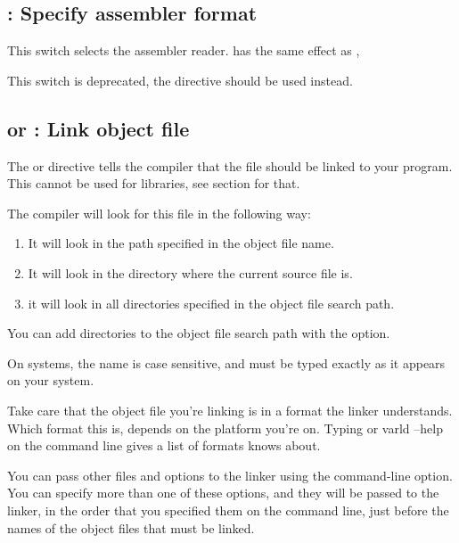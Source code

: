 \subsection{ : Specify assembler format}

This switch selects the assembler reader. 
has the same effect as , 

This switch is deprecated, the  directive should
be used instead.

\subsection{ or  : Link object file}

The  or  directive
tells the compiler that the file  should be linked to
your program. This cannot be used for libraries, see section
 for that.

The compiler will look for this file in the following way:

\begin{enumerate}
\item It will look in the path specified in the object file name.
\item It will look in the directory where the current source file is.
\item it will look in all directories specified in the object file search path.
\end{enumerate}
You can add directories to the object file search path with the 
option.

On \linux systems, the name is case sensitive, and must be typed
exactly as it appears on your system.

\begin{remark}Take care that the object file you're linking is in a
format the linker understands. Which format this is, depends on the platform
you're on. Typing  or var{ld --help} on the command line gives a list of formats
 knows about.
\end{remark}

You can pass other files and options to the linker using the 
command-line option. You can specify more than one of these options, and
they will be passed to the linker, in the order that you specified them on
the command line, just before the names of the object files that must be
linked.

